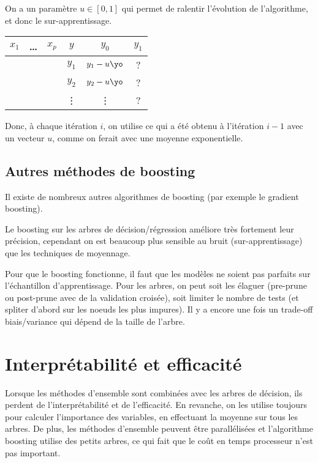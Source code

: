 	On a un paramètre $u \in [0, 1]$ qui permet de ralentir l'évolution de l'algorithme, et donc le sur-apprentissage.
	
	\begin{center}
	\begin{tabular}{ccc|ccc}
	$x_1$ & \dots & $x_p$ & $y$ & $y_0$ & $y_1$ \\ 
	\hline 
	  &   &   & $y_1$ & $y_1 - u\yo$ & ? \\ 
	  &   &   & $y_2$ & $y_2 - u\yo$ & ? \\ 
	  &   &  & \vdots & \vdots & ? \\ 
	\end{tabular} 
	\end{center}
	
	Donc, à chaque itération $i$, on utilise ce qui a été obtenu à l'itération $i - 1$ avec un vecteur $u$, comme on ferait avec une moyenne exponentielle.
	
	\subsection{Autres méthodes de boosting}
	
	Il existe de nombreux autres algorithmes de boosting (par exemple le gradient boosting).
	
	Le boosting sur les arbres de décision/régression améliore très fortement leur précision, cependant on est beaucoup plus sensible au bruit (sur-apprentissage) que les techniques de moyennage.
	
	Pour que le boosting fonctionne, il faut que les modèles ne soient pas parfaits sur l'échantillon d'apprentissage. Pour les arbres, on peut soit les élaguer (pre-prune ou post-prune avec de la validation croisée), soit limiter le nombre de tests (et spliter d'abord sur les noeuds les plus impures). Il y a encore une fois un trade-off biais/variance qui dépend de la taille de l'arbre.
	
\section{Interprétabilité et efficacité}
	
Lorsque les méthodes d'ensemble sont combinées avec les arbres de décision, ils perdent de l'interprétabilité et de l'efficacité. En revanche, on les utilise toujours pour calculer l'importance des variables, en effectuant la moyenne sur tous les arbres. De plus, les méthodes d'ensemble peuvent être parallélisées et l'algorithme boosting utilise des petits arbres, ce qui fait que le coût en temps processeur n'est pas important.
		
